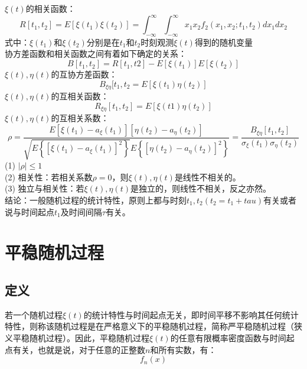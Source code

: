 \documentclass[12pt,a4paper,oneside]{ctexart}
\begin{document}
\indent $\xi(t)$的相关函数：
$$
R[t_{1},t_{2}] = E[\xi(t_{1})\xi(t_{2})] = \int_{-\infty}^{\infty}\int_{-\infty}^{\infty}x_{1}x_{2}f_{2}(x_{1},x_{2};t_{1},t_{2})dx_{1}dx_{2}
$$
\indent 式中：$\xi(t_{1})$和$\xi(t_{2})$分别是在$t_{1}$和$t_{2}$时刻观测$\xi(t)$得到的随机变量\\
\indent 协方差函数和相关函数之间有着如下确定的关系：
$$
B[t_{1},t_{2}] = R[t_{1},t{2}] - E[\xi(t_{1})]E[\xi(t_{2})]
$$
\indent $\xi(t),\eta(t)$的互协方差函数：
$$
B_{\xi\eta}[t_{1},t_{2} = E[\xi(t_{1})\eta(t_{2})]
$$
\indent $\xi(t),\eta(t)$的互相关函数：
$$
R_{\xi\eta}[t_{1},t_{2}] = E[\xi(t1)\eta(t_{2})]
$$
\indent $\xi(t),\eta(t)$的互相关系数：
$$
\rho = \frac{E[\xi(t_{1}) - a_{\xi}(t_{1})][\eta(t_{2}) - a_{\eta}(t_{2})]}{\sqrt{E\left\{[\xi(t_{1}) - a_{\xi}(t_{1})]^{2}\right\}}E\left\{[\eta(t_{2}) - a_{\eta}(t_{2})]^{2}\right\}} = \frac{B_{\xi\eta}[t_{1},t_{2}]}{\sigma_{\xi}(t_{1})\sigma_{\eta}(t_{2})}
$$
\indent (1) $|\rho|\le 1$\\
\indent (2) 相关性：若相关系数$\rho = 0$，则$\xi(t),\eta(t)$是线性不相关的。\\
\indent (3) 独立与相关性：若$\xi(t),\eta(t)$是独立的，则线性不相关，反之亦然。\\
\indent 结论：一般随机过程的统计特性，原则上都与时刻$t_{1},t_{2}(t_{2} = t_{1} + tau)$有关或者说与时间起点$t_{1}$及时间间隔$\tau$有关。
\section{平稳随机过程}
\subsection{定义}
若一个随机过程$\xi(t)$的统计特性与时间起点无关，即时间平移不影响其任何统计特性，则称该随机过程是在严格意义下的平稳随机过程，简称严平稳随机过程（狭义平稳随机过程）。因此，平稳随机过程$\xi(t)$的任意有限概率密度函数与时间起点有关，也就是说，对于任意的正整数$n$和所有实数，有：
$$
f_{n}(x)
$$
\end{document}

